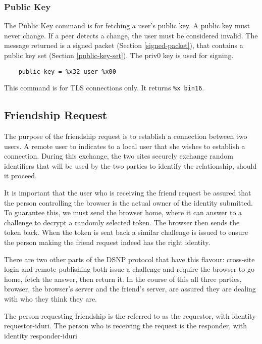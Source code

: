 \documentclass[letterpaper,11pt,oneside]{article}
\begin{document}
\subsubsection{Public Key}
\label{public-key-command}

The Public Key command is for fetching a user's public key. A public key must
never change. If a peer detects a change, the user must be considered invalid.
The message returned is a signed packet (Section \ref{signed-packet}), that
contains a public key set (Section \ref{public-key-set}). The priv0 key is used
for signing.

\vspace{10pt}
\begin{verbatim}
    public-key = %x32 user %x00
\end{verbatim}
\vspace{10pt}

This command is for TLS connections only. It returns \verb|%x bin16|.

\subsection{Friendship Request}

The purpose of the friendship request is to establish a connection between two
users. A remote user to indicates to a local user that she wishes to establish
a connection. During this exchange, the two sites securely exchange random
identifiers that will be used by the two parties to identify the relationship,
should it proceed.

It is important that the user who is receiving the friend request be assured
that the person controlling the browser is the actual owner of the identity
submitted. To guarantee this, we must send the browser home, where it can
answer to a challenge to decrypt a randomly selected token. The browser then
sends the token back. When the token is sent back a similar challenge is issued
to ensure the person making the friend request indeed has the right identity.

There are two other parts of the DSNP protocol that have this flavour:
cross-site login and remote publishing both issue a challenge and require the
browser to go home, fetch the answer, then return it. In the course of this all
three parties, browser, the browser's server and the friend's server, are
assured they are dealing with who they think they are.

The person requesting friendship is the referred to as the requestor, with
identity requestor-iduri. The person who is receiving the request is the responder, with
identity responder-iduri
\end{document}
